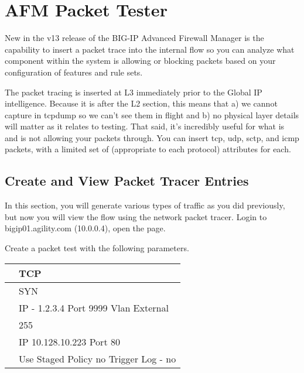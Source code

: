 \documentclass[letterpaper,10pt,english]{sphinxmanual}
\begin{document}
\section{AFM Packet Tester}
\label{\detokenize{class1/module2/module2:afm-packet-tester}}\label{\detokenize{class1/module2/module2::doc}}
New in the v13 release of the BIG-IP Advanced Firewall Manager is the capability to insert a packet trace into the internal flow so you can analyze what component within the system is allowing or blocking packets based on your configuration of features and rule sets.


The packet tracing is inserted at L3 immediately prior to the Global IP
intelligence. Because it is after the L2 section, this means that a) we
cannot capture in tcpdump so we can’t see them in flight and b) no
physical layer details will matter as it relates to testing. That said,
it’s incredibly useful for what is and is not allowing your packets
through. You can insert tcp, udp, sctp, and icmp packets, with a limited
set of (appropriate to each protocol) attributes for each.


\subsection{Create and View Packet Tracer Entries}
\label{\detokenize{class1/module2/lab1:create-and-view-packet-tracer-entries}}\label{\detokenize{class1/module2/lab1::doc}}
In this section, you will generate various types of traffic as you did
previously, but now you will view the flow using the network packet
tracer. Login to bigip01.agility.com (10.0.0.4), open the  page.


Create a packet test with the following parameters.


\begin{savenotes}\sphinxattablestart
\centering
\begin{tabulary}{\linewidth}[t]{|T|T|}
\hline

&
TCP
\\
\hline
{}
&
SYN
\\
\hline
{}
&
IP - 1.2.3.4
Port \textendash{} 9999
Vlan \textendash{} External
\\
\hline
{}
&
255
\\
\hline
{}
&
IP \textendash{} 10.128.10.223
Port \textendash{} 80
\\
\hline
{}
&
Use Staged Policy \textendash{} no
Trigger Log - no
\\
\hline
\end{tabulary}
\par
\sphinxattableend\end{savenotes}
\end{document}
